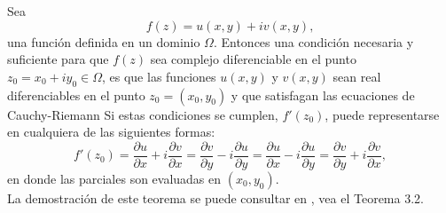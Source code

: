 \begin{teor}\label{TECR}
	Sea $$f(z)=u(x,y)+iv(x,y),$$ una función definida en un dominio $\Omega$. Entonces una
	condición necesaria y suficiente para que $f (z)$ sea complejo diferenciable en el punto
	$z_0 = x_0 + iy_0 \in \Omega$, es que las funciones $u(x, y)$ y $v(x, y)$ sean real diferenciables en el
	punto $z_0=(x_0, y_0)$ y que satisfagan las ecuaciones de Cauchy-Riemann
	Si estas condiciones se cumplen, $f'(z_0)$, puede representarse en cualquiera de las siguientes formas:
	\begin{equation}
		f'(z_0)=\dfrac{\partial u}{\partial x}+i\dfrac{\partial v}{\partial x}=\dfrac{\partial v}{\partial y}-i\dfrac{\partial u}{\partial y}=\dfrac{\partial u}{\partial x}-i\dfrac{\partial u}{\partial y}=\dfrac{\partial v}{\partial y}+i\dfrac{\partial v}{\partial x},
	\end{equation}
	 en donde las parciales son evaluadas en $(x_0, y_0)$.\\
	La demostración de este teorema se puede consultar en \cite{silverman}, vea el Teorema 3.2.
\end{teor}

